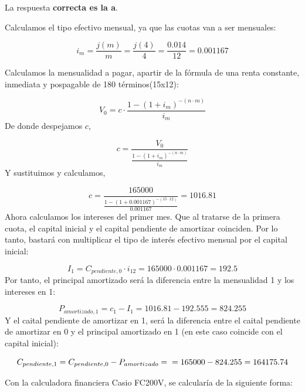 \documentclass[
  letterpaper,
  DIV=11,
  numbers=noendperiod]{scrreprt}
\begin{document}
\begin{tcolorbox}[enhanced jigsaw, left=2mm, opacityback=0, colback=white, breakable, arc=.35mm, bottomrule=.15mm, rightrule=.15mm, toprule=.15mm, leftrule=.75mm, colframe=quarto-callout-tip-color-frame]
\begin{minipage}[t]{5.5mm}
\textcolor{quarto-callout-tip-color}{\faLightbulb}
\end{minipage}%
\begin{minipage}[t]{\textwidth - 5.5mm}

La respuesta \textbf{correcta es la a}.

Calculamos el tipo efectivo mensual, ya que las cuotas van a ser
mensuales:

\[i_m=\frac{j\left(m\right)}{m}=\frac{j\left(4\right)}{4}=\frac{0.014}{12}=0.001167\]

Calculamos la mensualidad a pagar, apartir de la fórmula de una renta
constante, inmediata y pospagable de 180 términos(15x12):

\[V_0=c\cdot\frac{1-\left(1+i_m\right)^{-(n\cdot m)}}{i_m}\] De donde
despejamos \(c\),

\[c=\frac{V_0 }{\frac{1-\left(1+i_m\right)^{-(n\cdot m)}}{i_m} }\] Y
sustituimos y calculamos,

\[c=\frac{165000 }{\frac{1-\left(1+0.001167\right)^{-(15\cdot 12)}}{0.001167} }=1016.81\]
Ahora calculamos los intereses del primer mes. Que al tratarse de la
primera cuota, el capital inicial y el capital pendiente de amortizar
coinciden. Por lo tanto, bastará con multiplicar el tipo de interés
efectivo mensual por el capital inicial:

\[I_1=C_{pendiente,0}\cdot i_{12}=165000\cdot0.001167=192.5\] Por tanto,
el principal amortizado será la diferencia entre la mensualidad 1 y los
intereses en 1:

\[P_{amortizado,1}=c_1-I_1=1016.81-192.555=824.255\] Y el caital
pendiente de amortizar en 1, será la diferencia entre el caital
pendiente de amortizar en 0 y el principal amortizado en 1 (en este caso
coincide con el capital inicial):

\[C_{pendiente,1}=C_{pendiente,0}-P_{amortizado}=\\=165000-824.255=164175.74\]

Con la calculadora financiera Casio FC200V, se calcularía de la
siguiente forma:


\end{minipage}
\end{tcolorbox}
\end{document}
